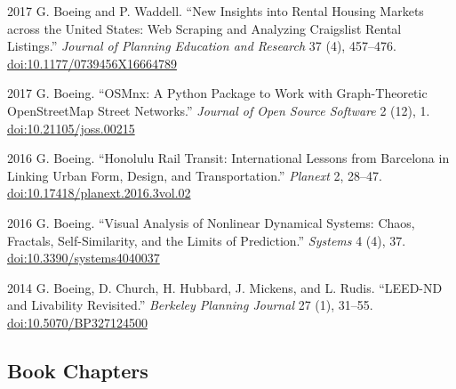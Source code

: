 \documentclass[11pt,letterpaper]{report}
\begin{document}
\begin{tablist}
        \item[2017] \tab{}G. Boeing and P. Waddell. \enquote{New Insights into Rental Housing Markets across the United States: Web Scraping and Analyzing Craigslist Rental Listings.} \textit{Journal of Planning Education and Research} 37 (4), 457--476. \href{https://doi.org/10.1177/0739456X16664789}{doi:10.1177/0739456X16664789}

        \item[2017] \tab{}G. Boeing. \enquote{OSMnx: A Python Package to Work with Graph-Theoretic OpenStreetMap Street Networks.} \textit{Journal of Open Source Software} 2 (12), 1. \href{https://doi.org/10.21105/joss.00215}{doi:10.21105/joss.00215}

        \item[2016] \tab{}G. Boeing. \enquote{Honolulu Rail Transit: International Lessons from Barcelona in Linking Urban Form, Design, and Transportation.} \textit{Planext} 2, 28--47. \href{https://doi.org/10.17418/planext.2016.3vol.02}{doi:10.17418/planext.2016.3vol.02}

        \item[2016] \tab{}G. Boeing. \enquote{Visual Analysis of Nonlinear Dynamical Systems: Chaos, Fractals, Self-Similarity, and the Limits of Prediction.} \textit{Systems} 4 (4), 37. \href{https://doi.org/10.3390/systems4040037}{doi:10.3390/systems4040037}

        \item[2014] \tab{}G. Boeing, D. Church, H. Hubbard, J. Mickens, and L. Rudis. \enquote{LEED-ND and Livability Revisited.} \textit{Berkeley Planning Journal} 27 (1), 31--55. \href{https://doi.org/10.5070/BP327124500}{doi:10.5070/BP327124500}

    \end{tablist}



    \subsection*{Book Chapters}
\end{document}
